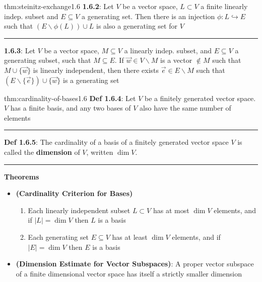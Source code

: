\documentclass[landscape, 8pt]{extarticle}
\begin{document}
\begin{multicols}{3}
\vspace{-5pt}
\begin{thm}{thm:steinitz-exchange}{1.6}
    \textbf{1.6.2}: Let $V$ be a vector space, $L \subset V$ a finite linearly indep. subset and $E \subseteq V$ a generating set. Then there is an injection $\phi : L \hookrightarrow E$ such that $(E \backslash \phi(L)) \cup L$ is also a generating set for $V$
    
    \vspace{-5pt}
    \noindent\rule{\textwidth}{0.2pt}
    \textbf{1.6.3}: Let $V$ be a vector space, $M \subseteq V$ a linearly indep. subset, and $E \subseteq V$ a generating subset, such that $M \subseteq E$. If $\vec{w}\in V\backslash M$ is a vector $\not\in M$ such that $M \cup \{ \vec{w}\}$ is linearly independent, then there exists $\vec{e}\in E \backslash M$ such that $(E \backslash \{\vec{e}\}) \cup \{\vec{w}\}$ is a generating set
\end{thm}

\vspace{-5pt}
\newpage

\begin{thm}{thm:cardinality-of-bases}{1.6}
    \textbf{Def 1.6.4}: Let $V$ be a finitely generated vector space. $V$ has a finite basis, and any two bases of $V$ also have the same number of elements

    \vspace{-5pt}
    \noindent\rule{\textwidth}{0.2pt}
    \textbf{Def 1.6.5}: The cardinality of a basis of a finitely generated vector space $V$ is called the \textbf{dimension} of $V$, written $\dim V$. 

    \vspace{-5pt}
    \noindent\rule{\textwidth}{0.2pt}


    \textbf{Theorems}
    \begin{itemize}
        \setlength\itemsep{0em}
        \item[\textbf{1.6.7}] \textbf{(Cardinality Criterion for Bases)}
        \vspace{-5pt}
        \begin{enumerate}
            \setlength\itemsep{0em}
            \item Each linearly independent subset $L \subset V$ has at most $\dim V$ elements, and if $\lvert L \rvert = \dim V$ then $L$ is a basis
            \vspace{-3pt}
            \item Each generating set $E \subseteq V$ has at least $\dim V$ elements, and if $\lvert E \rvert = \dim V$ then $E$ is a basis
        \end{enumerate}
        \item[\textbf{1.6.8}] \textbf{(Dimension Estimate for Vector Subspaces)}: A proper vector subspace of a finite dimensional vector space has itself a strictly smaller dimension


\end{itemize}
\end{thm}
\end{multicols}
\end{document}
